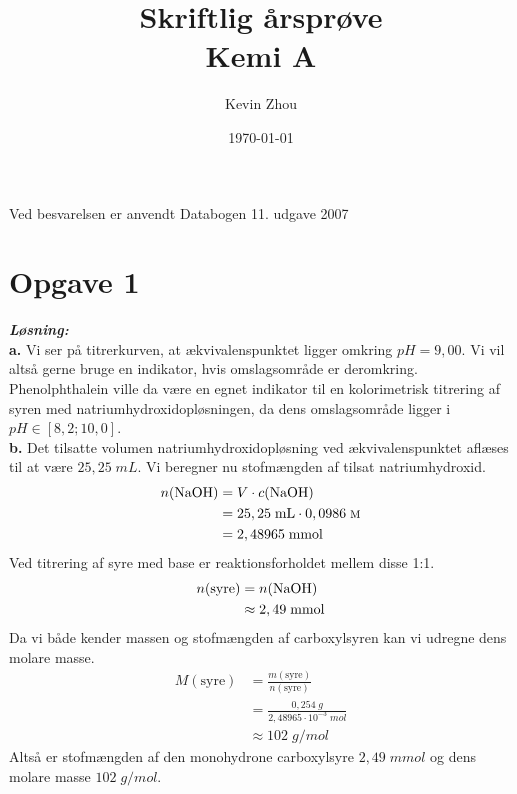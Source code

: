 \documentclass{report}
\title{Skriftlig årsprøve\\
{\Large \textbf{Kemi A}}}
\author{Kevin Zhou}
\date{\today}
\newcommand{\sol}{\setlength{\parindent}{0cm}\textbf{\textit{Løsning:}}\setlength{\parindent}{1cm}}
\begin{document}
\maketitle
\begin{note}
  Ved besvarelsen er anvendt Databogen 11. udgave 2007
\end{note}
\section*{Opgave 1}
\sol \\
\textbf{a.}
Vi ser på titrerkurven, at ækvivalenspunktet ligger omkring $pH=9,00$.
Vi vil altså gerne bruge en indikator, hvis omslagsområde er deromkring. 
Phenolphthalein ville da være  en egnet indikator til en kolorimetrisk titrering af syren med natriumhydroxidopløsningen, da dens omslagsområde ligger i $pH \in [8,2;10,0]$.\\[1ex]
\textbf{b.}
Det tilsatte volumen natriumhydroxidopløsning ved ækvivalenspunktet aflæses til at være $25,25 \;\unit{mL} $.
Vi beregner nu stofmængden af tilsat natriumhydroxid.
\begin{equation*}
\begin{split}
  n(\ce{NaOH} )&= V \cdot c(\ce{NaOH} )\\ 
  &= 25,25 \;\unit{mL} \cdot 0,0986 \;\unit{\textsc{m}} \\ 
  &=2,48965 \;\unit{mmol} 
\end{split}
\end{equation*}
Ved titrering af syre med base er reaktionsforholdet mellem disse 1:1.
\begin{equation*}
\begin{split}
  n(\text{syre})&=n(\ce{NaOH} )\\ 
  &\approx 2,49 \;\unit{mmol} 
\end{split}
\end{equation*}
Da vi både kender massen og stofmængden af carboxylsyren kan vi udregne dens molare masse.
\begin{equation*}
\begin{split}
  M(\text{syre} )&=\frac{m(\text{syre} )}{n(\text{syre} )}\\ 
  &=\frac{0,254 \;\unit{g} }{2,48965 \cdot 10^{-3} \;\unit{mol} }\\ 
  &\approx 102 \;\unit{g/mol} 
\end{split}
\end{equation*}
Altså er stofmængden af den monohydrone carboxylsyre $2,49 \;\unit{mmol} $ og dens molare masse $102 \;\unit{g/mol} $.\\[1ex]
\end{document}
